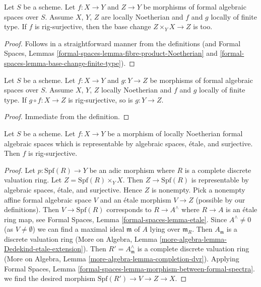 \begin{lemma}
\label{lemma-base-change-rig-surjective}
Let $S$ be a scheme. Let $f : X \to Y$ and $Z \to Y$ be morphisms
of formal algebraic spaces over $S$. Assume $X$, $Y$, $Z$ are locally
Noetherian and $f$ and $g$ locally of finite type. If $f$ is
rig-surjective, then the base change $Z \times_Y X \to Z$ is too.
\end{lemma}

\begin{proof}
Follows in a straightforward manner from the definitions (and
Formal Spaces, Lemmas \ref{formal-spaces-lemma-fibre-product-Noetherian} and
\ref{formal-spaces-lemma-base-change-finite-type}).
\end{proof}

\begin{lemma}
\label{lemma-permanence-rig-surjective}
Let $S$ be a scheme. Let $f : X \to Y$ and $g : Y \to Z$ be morphisms of
formal algebraic spaces over $S$. Assume $X$, $Y$, $Z$ locally Noetherian
and $f$ and $g$ locally of finite type. If $g \circ f : X \to Z$
is rig-surjective, so is $g : Y \to Z$.
\end{lemma}

\begin{proof}
Immediate from the definition.
\end{proof}

\begin{lemma}
\label{lemma-etale-covering-rig-surjective}
Let $S$ be a scheme. Let $f : X \to Y$ be a morphism of locally Noetherian
formal algebraic spaces which is representable by algebraic spaces, \'etale,
and surjective. Then $f$ is rig-surjective.
\end{lemma}

\begin{proof}
Let $p : \text{Spf}(R) \to Y$ be an adic morphism where $R$ is a complete
discrete valuation ring. Let $Z = \text{Spf}(R) \times_Y X$. Then
$Z \to \text{Spf}(R)$ is representable by algebraic spaces, \'etale, and
surjective. Hence $Z$ is nonempty. Pick a nonempty affine formal algebraic
space $V$ and an \'etale morphism $V \to Z$ (possible by our definitions).
Then $V \to \text{Spf}(R)$ corresponds to $R \to A^\wedge$ where
$R \to A$ is an \'etale ring map, see Formal Spaces, Lemma
\ref{formal-spaces-lemma-etale}. Since $A^\wedge \not = 0$
(as $V \not = \emptyset$) we can find a maximal ideal $\mathfrak m$
of $A$ lying over $\mathfrak m_R$. Then $A_\mathfrak m$ is a discrete
valuation ring (More on Algebra, Lemma
\ref{more-algebra-lemma-Dedekind-etale-extension}).
Then $R' = A_\mathfrak m^\wedge$ is a complete discrete valuation ring
(More on Algebra, Lemma \ref{more-algebra-lemma-completion-dvr}).
Applying Formal Spaces, Lemma
\ref{formal-spaces-lemma-morphism-between-formal-spectra}.
we find the desired morphism $\text{Spf}(R') \to V \to Z \to X$.
\end{proof}

